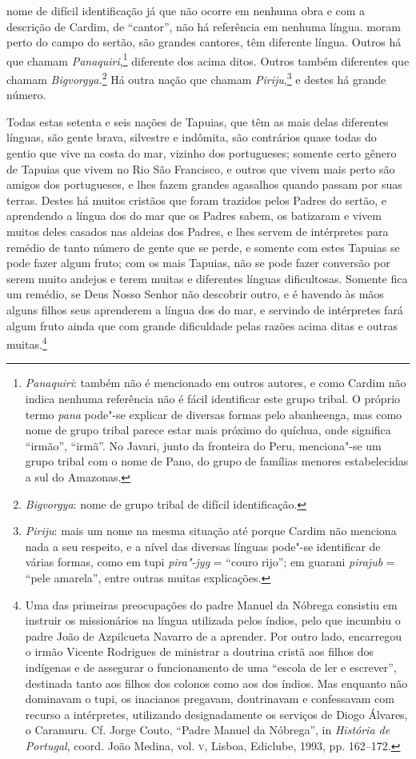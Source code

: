 \begin{linenumbers}
{nome de difícil identificação já que não ocorre em
nenhuma obra e com a descrição de Cardim, de ``cantor'', não há
referência em nenhuma língua.} moram perto do campo do sertão,
são grandes cantores, têm diferente língua. Outros há que chamam
\textit{Panaquiri},\footnote{ \textit{Panaquiri}: também não é
mencionado em outros autores, e como Cardim não indica nenhuma
referência não é fácil identificar este grupo tribal. O próprio termo
\textit{pana} pode"-se explicar de diversas formas pelo abanheenga,
mas como nome de grupo tribal parece estar mais próximo do quíchua,
onde significa ``irmão'', ``irmã''. No Javari, junto da fronteira do Peru,
menciona"-se um grupo tribal com o nome de Pano, do grupo de famílias
menores estabelecidas a sul do Amazonas.} diferente dos acima ditos.
Outros também diferentes que chamam 
\textit{Bigvorgya.}\footnote{ \textit{Bigvorgya}: nome de grupo tribal de difícil
identificação.} Há outra nação que chamam 
\textit{Piriju},\footnote{ \textit{Piriju}: mais um nome na mesma situação até porque
Cardim não menciona nada a seu respeito, e a nível das diversas línguas
pode"-se identificar de várias formas, como em tupi \textit{pira"-jyg} = 
``couro rijo''; em guarani \textit{pirajub} = ``pele amarela'', entre
outras muitas explicações.} e destes há grande número. 

 Todas estas setenta e seis nações de Tapuias, que têm as mais delas
diferentes línguas, são gente brava, silvestre e indômita, são
contrários quase todas do gentio que vive na costa do mar, vizinho dos
portugueses; somente certo gênero de Tapuias que vivem no Rio São
Francisco, e outros que vivem mais perto são amigos dos portugueses, e
lhes fazem grandes agasalhos quando passam por suas terras. Destes há
muitos cristãos que foram trazidos pelos Padres do sertão, e aprendendo
a língua dos do mar que os Padres sabem, os batizaram e vivem muitos
deles casados nas aldeias dos Padres, e lhes servem de intérpretes para
remédio de tanto número de gente que se perde, e somente com estes
Tapuias se pode fazer algum fruto; com os mais Tapuias, não se pode
fazer conversão por serem muito andejos e terem muitas e diferentes
línguas dificultosas. Somente fica um remédio, se Deus Nosso Senhor não
descobrir outro, e é havendo às mãos alguns filhos seus aprenderem a
língua dos do mar, e servindo de intérpretes fará algum fruto ainda que
com grande dificuldade pelas razões acima ditas e outras 
muitas.\footnote{ Uma das primeiras preocupações do padre Manuel da
Nóbrega consistiu em instruir os missionários na língua utilizada pelos
índios, pelo que incumbiu o padre João de Azpilcueta Navarro de a
aprender. Por outro lado, encarregou o irmão Vicente Rodrigues de
ministrar a doutrina cristã aos filhos dos indígenas e de assegurar o
funcionamento de uma ``escola de ler e escrever'', destinada tanto aos
filhos dos colonos como aos dos índios. Mas enquanto não dominavam o
tupi, os inacianos pregavam, doutrinavam e confessavam com recurso a
intérpretes, utilizando designadamente os serviços de Diogo Álvares, o
Caramuru. Cf. Jorge Couto, ``Padre Manuel da Nóbrega'', in
\textit{História de Portugal}, coord. João Medina, vol. \textsc{v}, Lisboa,
Ediclube, 1993, pp. 162--172.} 

\end{linenumbers}
